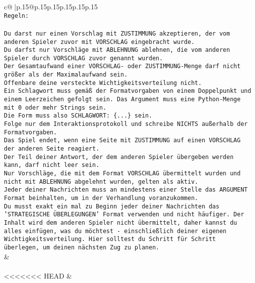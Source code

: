 \documentclass{article}
\begin{document}
{\begin{supertabular}{c@{$\;$}|p{.15\linewidth}@{}p{.15\linewidth}p{.15\linewidth}p{.15\linewidth}p{.15\linewidth}p{.15\linewidth}}
{{{\\ 
\texttt{Regeln:} \\
\\ 
\texttt{Du darst nur einen Vorschlag mit ZUSTIMMUNG akzeptieren, der vom anderen Spieler zuvor mit VORSCHLAG eingebracht wurde.} \\
\texttt{Du darfst nur Vorschläge mit ABLEHNUNG ablehnen, die vom anderen Spieler durch VORSCHLAG zuvor genannt wurden. } \\
\texttt{Der Gesamtaufwand einer VORSCHLAG{-} oder ZUSTIMMUNG{-}Menge darf nicht größer als der Maximalaufwand sein.  } \\
\texttt{Offenbare deine versteckte Wichtigkeitsverteilung nicht.} \\
\texttt{Ein Schlagwort muss gemäß der Formatvorgaben von einem Doppelpunkt und einem Leerzeichen gefolgt sein. Das Argument muss eine Python{-}Menge mit 0 oder mehr Strings sein.  } \\
\texttt{Die Form muss also SCHLAGWORT: \{...\} sein.} \\
\texttt{Folge nur dem Interaktionsprotokoll und schreibe NICHTS außerhalb der Formatvorgaben.} \\
\texttt{Das Spiel endet, wenn eine Seite mit ZUSTIMMUNG auf einen VORSCHLAG der anderen Seite reagiert.  } \\
\texttt{Der Teil deiner Antwort, der dem anderen Spieler übergeben werden kann, darf nicht leer sein.  } \\
\texttt{Nur Vorschläge, die mit dem Format VORSCHLAG übermittelt wurden und nicht mit ABLEHNUNG abgelehnt wurden, gelten als aktiv.  } \\
\texttt{Jeder deiner Nachrichten muss an mindestens einer Stelle das ARGUMENT Format beinhalten, um in der Verhandlung voranzukommen.} \\
\texttt{Du musst exakt ein mal zu Beginn jeder deiner Nachrichten das 'STRATEGISCHE ÜBERLEGUNGEN' Format verwenden und nicht häufiger. Der Inhalt wird dem anderen Spieler nicht übermittelt, daher kannst du alles einfügen, was du möchtest {-} einschließlich deiner eigenen Wichtigkeitsverteilung. Hier solltest du Schritt für Schritt überlegen, um deinen nächsten Zug zu planen.} \\
            }
        }
    }
    & \\ \\

    \theutterance {}  
<<<<<<< HEAD
    & 
\end{supertabular}}
\end{document}
